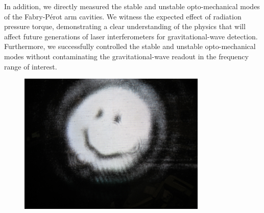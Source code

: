 In addition, we directly measured the stable and unstable
opto-mechanical modes of the Fabry-P\'{e}rot arm cavities. We witness
the expected effect of radiation pressure torque, demonstrating a
clear understanding of the physics that will affect future generations
of laser interferometers for gravitational-wave
detection. Furthermore, we successfully controlled the stable and
unstable opto-mechanical modes without contaminating the
gravitational-wave readout in the frequency range of interest.


\begin{figure}
\begin{centering}
\includegraphics[width=0.8\textwidth]{figures/PMCRefl_smiley.JPG}
\label{fig:smiley}
\end{centering}
\end{figure}


